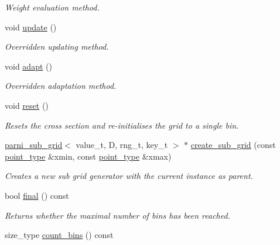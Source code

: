 \begin{DoxyCompactItemize}
\begin{DoxyCompactList}\small\item\em Weight evaluation method. \end{DoxyCompactList}\item 
\hypertarget{a00393_aa45eadeb0e8e3430eaf424af677655a9}{}void \hyperlink{a00393_aa45eadeb0e8e3430eaf424af677655a9}{update} ()\label{a00393_aa45eadeb0e8e3430eaf424af677655a9}

\begin{DoxyCompactList}\small\item\em Overridden updating method. \end{DoxyCompactList}\item 
\hypertarget{a00393_a2055bd14f6ef5d6d6f3c86286ca4f6ff}{}void \hyperlink{a00393_a2055bd14f6ef5d6d6f3c86286ca4f6ff}{adapt} ()\label{a00393_a2055bd14f6ef5d6d6f3c86286ca4f6ff}

\begin{DoxyCompactList}\small\item\em Overridden adaptation method. \end{DoxyCompactList}\item 
void \hyperlink{a00393_a8cb35e6d97875930cbe19bba2323162e}{reset} ()
\begin{DoxyCompactList}\small\item\em Resets the cross section and re-\/initialises the grid to a single bin. \end{DoxyCompactList}\item 
\hypertarget{a00393_a0a7e6fe3d2a7f2fdfd363c9a19224ee3}{}\hyperlink{a00397}{parni\+\_\+sub\+\_\+grid}$<$ value\+\_\+t, D, rng\+\_\+t, key\+\_\+t $>$ $\ast$ \hyperlink{a00393_a0a7e6fe3d2a7f2fdfd363c9a19224ee3}{create\+\_\+sub\+\_\+grid} (const \hyperlink{a00579}{point\+\_\+type} \&xmin, const \hyperlink{a00579}{point\+\_\+type} \&xmax)\label{a00393_a0a7e6fe3d2a7f2fdfd363c9a19224ee3}

\begin{DoxyCompactList}\small\item\em Creates a new sub grid generator with the current instance as parent. \end{DoxyCompactList}\item 
\hypertarget{a00393_a731c871e71c7722f3fa8dbcb6b7f4412}{}bool \hyperlink{a00393_a731c871e71c7722f3fa8dbcb6b7f4412}{final} () const \label{a00393_a731c871e71c7722f3fa8dbcb6b7f4412}

\begin{DoxyCompactList}\small\item\em Returns whether the maximal number of bins has been reached. \end{DoxyCompactList}\item 
\hypertarget{a00393_a5f67d9127c31d5236c73e88fbdbb0898}{}size\+\_\+type \hyperlink{a00393_a5f67d9127c31d5236c73e88fbdbb0898}{count\+\_\+bins} () const \label{a00393_a5f67d9127c31d5236c73e88fbdbb0898}


\end{DoxyCompactItemize}
